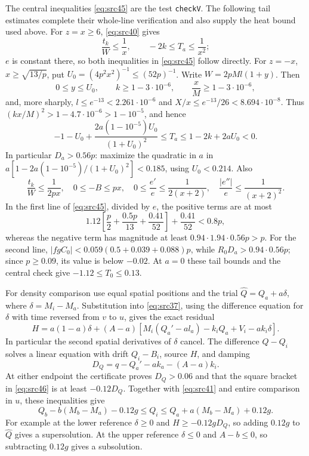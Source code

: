\documentclass[11pt,a4paper]{article}
\numberwithin{equation}{section}
\theoremstyle{definition}
\theoremstyle{remark}
\begin{document}
The central inequalities \eqref{eq:src45} are the test
\texttt{checkV}.  The following tail estimates complete their
whole-line verification and also supply the heat bound used above.
For $z=x\ge6$, \eqref{eq:src40} gives
\[
 \frac{t_k}{W}\le\frac1x,\qquad -2k\le T_a\le\frac1{x^2};
\]
$e$ is constant there, so both inequalities in
\eqref{eq:src45} follow directly.  For $z=-x$,
$x\ge\sqrt{13/p}$, put
$U_0=(4p^2x^2)^{-1}\le(52p)^{-1}$.  Write
$W=2pMl(1+y)$.  Then
\[
 0\le y\le U_0,\qquad k\ge1-3\cdot10^{-6},\qquad
 \frac{x}{M}\ge1-3\cdot10^{-6},
\]
and, more sharply,
$l\le e^{-13}<2.261\cdot10^{-6}$ and
$X/x\le e^{-13}/26<8.694\cdot10^{-8}$.
Thus $(kx/M)^2>1-4.7\cdot10^{-6}>1-10^{-5}$, and hence
\[
 -1-U_0+\frac{2a(1-10^{-5})U_0}{(1+U_0)^2}
 \le T_a\le1-2k+2aU_0<0.
\]
In particular $D_a>0.56p$: maximize the quadratic in $a$ in
$a[1-2a(1-10^{-5})/(1+U_0)^2]<0.185$, using $U_0<0.214$.
Also
\[
 \frac{t_k}{W}\le\frac1{2px},\quad
 0\le-B\le px,\quad
 0\le\frac{e'}e\le\frac1{2(x+2)},\quad
 \frac{|e''|}e\le\frac1{(x+2)^2}.
\]
In the first line of \eqref{eq:src45}, divided by $e$, the positive
terms are at most
\[
 1.12\left[\frac p2+\frac{0.5p}{13}+\frac{0.41}{52}\right]
       +\frac{0.41}{52}<0.8p,
\]
whereas the negative term has magnitude at least
$0.94\cdot1.94\cdot0.56p>p$.
For the second line,
$|fgC_0|<0.059(0.5+0.039+0.088)p$, while
$R_0D_a>0.94\cdot0.56p$; since $p\ge0.09$, its value is below
$-0.02$.  At $a=0$ these tail bounds and the central check give
$-1.12\le T_0\le0.13$.

For density comparison use equal spatial positions and the trial
$\widehat Q=Q_a+a\delta$, where $\delta=M_i-M_a$.  Substitution into
\eqref{eq:src37}, using the difference equation for $\delta$ with
time reversed from $v$ to $u$, gives the exact residual
\begin{equation}
 H=a(1-a)\delta
 +(A-a)\left[M_i(Q_a'-al_a)-k_iQ_a+V_i-ak_i\delta\right].
 \label{eq:src46}
\end{equation}
In particular the second spatial derivatives of $\delta$ cancel.
The difference $\widehat Q-Q_i$ solves a linear equation with drift
$Q_i-B_i$, source $H$, and damping
\[
 D_Q=q-Q_a'-ak_a-(A-a)k_i.
\]
At either endpoint the certificate proves $D_Q>0.06$ and that the
square bracket in \eqref{eq:src46} is at least $-0.12D_Q$.
Together with \eqref{eq:src41} and entire comparison in $u$, these
inequalities give
\begin{equation}
 Q_b-b(M_b-M_a)-0.12g
 \le Q_i\le
 Q_a+a(M_b-M_a)+0.12g.
 \label{eq:src47}
\end{equation}
For example at the lower reference $\delta\ge0$ and
$H\ge-0.12gD_Q$, so adding $0.12g$ to $\widehat Q$ gives a
supersolution.  At the upper reference $\delta\le0$ and $A-b\le0$,
so subtracting $0.12g$ gives a subsolution.
\end{document}
